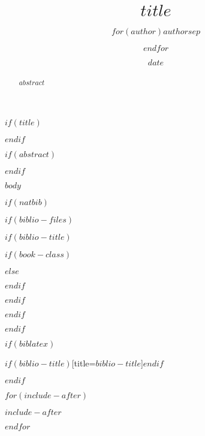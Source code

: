 \documentclass{tufte-handout}
\title{$title$}
\author{$for(author)$$author$$sep$ \and $endfor$}
\date{$date$}
\begin{document}
$if(title)$

\maketitle

$endif$

 

\bigskip



$if(abstract)$

\begin{abstract}

$abstract$

\end{abstract}

$endif$



$body$

 

$if(natbib)$

$if(biblio-files)$

$if(biblio-title)$

$if(book-class)$

\renewcommand\bibname{$biblio-title$}

$else$

\renewcommand\refname{$biblio-title$}

$endif$

$endif$





$endif$

$endif$

$if(biblatex)$

\printbibliography$if(biblio-title)$[title=$biblio-title$]$endif$

$endif$

$for(include-after)$

$include-after$

$endfor$
\end{document}

